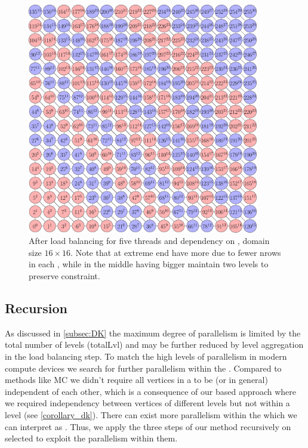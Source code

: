     
    \begin{figure}
      \begin{minipage}[c]{0.63\textwidth}
      	\includegraphics[height=0.26\textheight,width=0.9\textwidth]{pics/load_balancing/2d-7pt/stencil_2d_7pt}
      \end{minipage}\hfill
      \begin{minipage}[c]{0.34\textwidth}
      	\caption{After load balancing for five threads and \DTWO dependency on \stex, domain size $16 \times 16$. Note that \levelGroups at extreme end have more \levels due to fewer \acrshort{nrows} in each \level, while \levelGroups in the middle having bigger \levels maintain two levels to preserve \DTWO constraint.
      	} \label{fig:2d_7pt_lb}
      \end{minipage}
     \end{figure}
     

	\subsection{Recursion}\label{subsec:REC}
As discussed in \cref{subsec:DK} the maximum degree of parallelism is limited by the total number of levels (\acrshort{totalLvl}) and may be further reduced by level aggregation in the load balancing step.  To match the high levels of parallelism in modern compute devices we search for further parallelism within the \levelGroups.  Compared to methods like \acrshort{MC} we didn't require all vertices in a \levelGroup to be \DONE (or \DK in general) independent of each other, which is a consequence of our \level based approach where we required \DK independency between vertices of different levels but not within a level (see \cref{corollary_dk}). There can exist more parallelism within the \levelGroups which we can interpret as \subgraphs.  Thus, we apply the three steps of our method recursively on selected \subgraphs to exploit the parallelism within them.  

